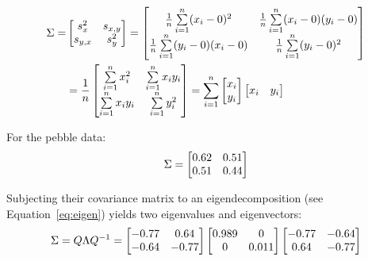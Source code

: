 \begin{equation}
  \begin{split}
  \Sigma = &
  \left[
    \begin{array}{@{}cc@{}}
      s_x^2 & s_{x,y} \\
      s_{y,x} & s_y^2
    \end{array}
    \right] =
  \left[
    \begin{array}{@{}cc@{}}
      \frac{1}{n}\sum\limits_{i=1}^{n} (x_i-0)^2 & 
      \frac{1}{n}\sum\limits_{i=1}^{n} (x_i-0)(y_i-0) \\
      \frac{1}{n}\sum\limits_{i=1}^{n} (y_i-0)(x_i-0) &
      \frac{1}{n}\sum\limits_{i=1}^{n} (y_i-0)^2
    \end{array}
    \right] \\
  ~ & =
  \frac{1}{n}
  \left[
    \begin{array}{@{}cc@{}}
      \sum\limits_{i=1}^{n} x_i^2 & 
      \sum\limits_{i=1}^{n} x_iy_i \\
      \sum\limits_{i=1}^{n} x_iy_i &
      \sum\limits_{i=1}^{n} y_i^2
    \end{array}
    \right] =
  \sum\limits_{i=1}^{n}
  \left[
    \begin{array}{@{}c@{}}
      x_i \\ y_i
    \end{array}
    \right]
  \left[
    \begin{array}{@{}cc@{}}
      x_i & y_i
    \end{array}
    \right]
  \end{split}
  \label{eq:sphericalsigma}
\end{equation}

For the pebble data:
\[
\Sigma =
\left[
  \begin{array}{@{}cc@{}}
    0.62 & 0.51 \\
    0.51 & 0.44
  \end{array}
  \right]
\]
    
Subjecting their covariance matrix to an eigendecomposition (see
Equation~\ref{eq:eigen}) yields two eigenvalues and eigenvectors:
\[
\Sigma = Q \Lambda Q^{-1} =
\left[
  \begin{array}{@{}cc@{}}
    -0.77 & 0.64 \\
    -0.64 & -0.77
  \end{array}
  \right]
\left[
  \begin{array}{@{}cc@{}}
    0.989  & 0 \\
    0 & 0.011
  \end{array}
  \right]
\left[
  \begin{array}{@{}cc@{}}
    -0.77 & -0.64 \\
    0.64 & -0.77
  \end{array}
  \right]
\]

